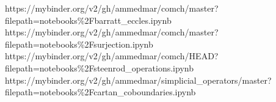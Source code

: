 		{https://mybinder.org/v2/gh/ammedmar/comch/master?filepath=notebooks\%2Fbarratt_eccles.ipynb}
		{https://mybinder.org/v2/gh/ammedmar/comch/master?filepath=notebooks\%2Fsurjection.ipynb}
		{https://mybinder.org/v2/gh/ammedmar/comch/HEAD?filepath=notebooks\%2Fsteenrod_operations.ipynb}
		{https://mybinder.org/v2/gh/ammedmar/simplicial_operators/master?filepath=notebooks\%2Fcartan_coboundaries.ipynb}
